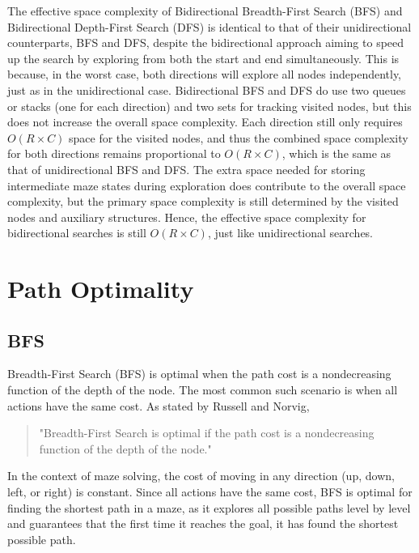 \documentclass[final, journal, 11pt]{report}
\begin{document}
		The effective space complexity of Bidirectional Breadth-First Search (BFS) and Bidirectional Depth-First Search (DFS) is identical to that of their unidirectional counterparts, BFS and DFS, despite the bidirectional approach aiming to speed up the search by exploring from both the start and end simultaneously. This is because, in the worst case, both directions will explore all nodes independently, just as in the unidirectional case. Bidirectional BFS and DFS do use two queues or stacks (one for each direction) and two sets for tracking visited nodes, but this does not increase the overall space complexity. Each direction still only requires \(O(R \times C)\) space for the visited nodes, and thus the combined space complexity for both directions remains proportional to \(O(R \times C)\), which is the same as that of unidirectional BFS and DFS. The extra space needed for storing intermediate maze states during exploration does contribute to the overall space complexity, but the primary space complexity is still determined by the visited nodes and auxiliary structures. Hence, the effective space complexity for bidirectional searches is still \(O(R \times C)\), just like unidirectional searches.
		
		
		
	
	
	\section*{Path Optimality}
		\subsection*{BFS}
		
		Breadth-First Search (BFS) is optimal when the path cost is a nondecreasing function of the depth of the node. The most common such scenario is when all actions have the same cost. As stated by Russell and Norvig,
		
		\begin{quote}
		    "Breadth-First Search is optimal if the path cost is a nondecreasing function of the depth of the node."
		\end{quote}
		
		In the context of maze solving, the cost of moving in any direction (up, down, left, or right) is constant. Since all actions have the same cost, BFS is optimal for finding the shortest path in a maze, as it explores all possible paths level by level and guarantees that the first time it reaches the goal, it has found the shortest possible path.
		
\end{document}
